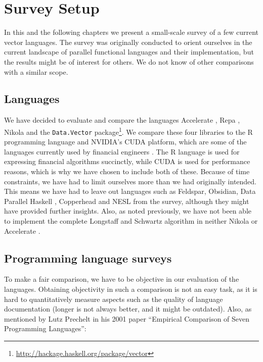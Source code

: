 \chapter{Survey Setup}
In this and the following chapters we present a small-scale survey of
a few current vector languages. The survey was originally conducted to
orient ourselves in the current landscape of parallel functional
languages and their implementation, but the results might be of
interest for others. We do not know of other comparisons with a
similar scope.

\section{Languages}
We have decided to evaluate and compare the languages Accelerate
\cite{chakravarty2011accelerating}, Repa \cite{keller2010regular},
Nikola \cite{mainland2010nikola} and the \texttt{Data.Vector}
package\footnote{\url{http://hackage.haskell.org/package/vector}}. We
compare these four libraries to the R programming language and
NVIDIA's CUDA platform, which are some of the languages currently used
by financial engineers . The R language is used for expressing financial algorithms
succinctly, while CUDA is used for performance reasons, which is why
we have chosen to include both of these. Because of time constraints,
we have had to limit ourselves more than we had originally
intended. This means we have had to leave out languages such as
Feldspar\cite{axelsson2010feldspar},
Obsidian\cite{svensson2011obsidian}, Data Parallel Haskell \cite{},
Copperhead\cite{Catanzaro2011} and NESL\cite{nesl} from the survey,
although they might have provided further insights. Also, as noted
previously, we have not been able to implement the complete Longstaff
and Schwartz algorithm in neither Nikola or Accelerate .


\section{Programming language surveys}
To make a fair comparison, we have to be objective in our evaluation
of the languages. Obtaining objectivity in such a comparison is not
an easy task, as it is hard to quantitatively measure aspects such as
the quality of language documentation (longer is not always better,
and it might be outdated). Also, as mentioned by Lutz Prechelt in his
2001 paper ``Empirical Comparison of Seven Programming Languages'':


